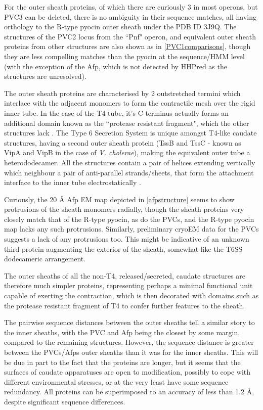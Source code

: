 For the outer sheath proteins, of which there are curiously 3 in most operons, but PVC3 can be deleted, there is no ambiguity in their sequence matches, all having orthology to the R-type pyocin outer sheath under the PDB ID 3J9Q. The structures of the PVC2 locus from the ``Pnf" operon, and equivalent outer sheath proteins from other structures are also shown as in \vref{PVC1comparisons}, though they are less compelling matches than the pyocin at the sequence/HMM level (with the exception of the Afp, which is not detected by HHPred as the structures are unresolved).

The outer sheath proteins are characterised by 2 outstretched termini which interlace with the adjacent monomers to form the contractile mesh over the rigid inner tube. In the case of the T4 tube, it's C-terminus actually forms an additional domain known as the ``protease resistant fragment", which the other structures lack \citep{Aksyuk2009}. The Type 6 Secretion System is unique amongst T4-like caudate structures, having a second outer sheath protein (TssB and TssC - known as VipA and VipB in the case of \emph{V. cholerae}), making the equivalent outer tube a heterododecamer. All the structures contain a pair of helices extending vertically which neighbour a pair of anti-parallel strands/sheets, that form the attachment interface to the inner tube electrostatically \cite{Ge2015a}.

Curiously, the 20 \AA{} Afp EM map depicted in \vref{afpstructure} seems to show protrusions of the sheath monomers radially, though the sheath proteins very closely match that of the R-type pyocin, as do the PVCs, and the R-type pyocin map lacks any such protrusions. Similarly, preliminary cryoEM data for the PVCs suggests a lack of any protrusions too. This might be indicative of an unknown third protein augmenting the exterior of the sheath, somewhat like the T6SS dodecameric arrangement.

The outer sheaths of all the non-T4, released/secreted, caudate structures are therefore much simpler proteins, representing perhaps a minimal functional unit capable of exerting the contraction, which is then decorated with domains such as the protease resistant fragment of T4 to confer further features to the sheath.

The pairwise sequence distances between the outer sheaths tell a similar story to the inner sheaths, with the PVC and Afp being the closest by some margin, compared to the remaining structures. However, the sequence distance is greater between the PVCs/Afps outer sheaths than it was for the inner sheaths. This will be due in part to the fact that the proteins are longer, but it seems that the surfaces of caudate apparatuses are open to modification, possibly to cope with different environmental stresses, or at the very least have some sequence redundancy. All proteins can be superimposed to an accuracy of less than 1.2 \AA, despite significant sequence differences.

